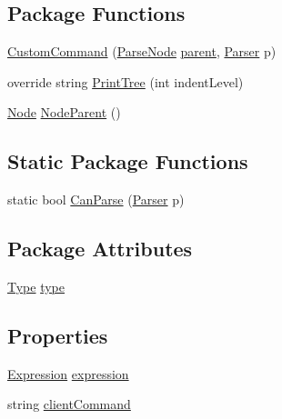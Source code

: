 \subsection*{Package Functions}
\begin{DoxyCompactItemize}
\item 
\hyperlink{a00046_a49150c9046dcad61d61ce35c51816313}{Custom\-Command} (\hyperlink{a00077}{Parse\-Node} \hyperlink{a00077_af313a82103fcc2ff5a177dbb06b92f7b}{parent}, \hyperlink{a00078}{Parser} p)
\item 
override string \hyperlink{a00046_ad8c821f5f5671cdbac6e4a6fc0b9174b}{Print\-Tree} (int indent\-Level)
\item 
\hyperlink{a00068}{Node} \hyperlink{a00077_a580e520a29444fc23ac3660cbe514a09}{Node\-Parent} ()
\end{DoxyCompactItemize}
\subsection*{Static Package Functions}
\begin{DoxyCompactItemize}
\item 
static bool \hyperlink{a00046_a02ee2902115c823bdb46715041b3a2f6}{Can\-Parse} (\hyperlink{a00078}{Parser} p)
\end{DoxyCompactItemize}
\subsection*{Package Attributes}
\begin{DoxyCompactItemize}
\item 
\hyperlink{a00046_a1d9f9f57c44e1a0d228793b658339576}{Type} \hyperlink{a00046_a5ef3bc96812be224d91548bfcdfd4b92}{type}
\end{DoxyCompactItemize}
\subsection*{Properties}
\begin{DoxyCompactItemize}
\item 
\hyperlink{a00054}{Expression} \hyperlink{a00046_a4250d192d5b58e2404a14c68eb616f16}{expression}
\item 
string \hyperlink{a00046_a1a362244273df822233359d8fe4e9f5d}{client\-Command}
\end{DoxyCompactItemize}


